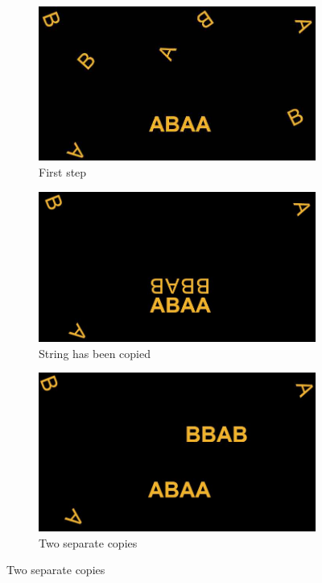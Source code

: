 \documentclass[]{article}
\begin{document}
\begin{figure}[H]
	\caption[Template Regulators]{Template Regulators\cite{von1986self,virgo2012evolvable}}\label{fig:TemplateReplicators}
	\begin{subfigure}[t]{0.45\textwidth}
		\caption{First step}
		\includegraphics[width=\textwidth]{TemplateReplicators1}
	\end{subfigure}
	\;\;
	\begin{subfigure}[t]{0.45\textwidth}
		\caption{String has been copied}
		\includegraphics[width=\textwidth]{TemplateReplicators2}
	\end{subfigure}
	\begin{subfigure}[t]{0.45\textwidth}
		\caption{Two separate copies}
		\includegraphics[width=\textwidth]{TemplateReplicators3}

\end{subfigure}
\end{figure}
\end{document}
